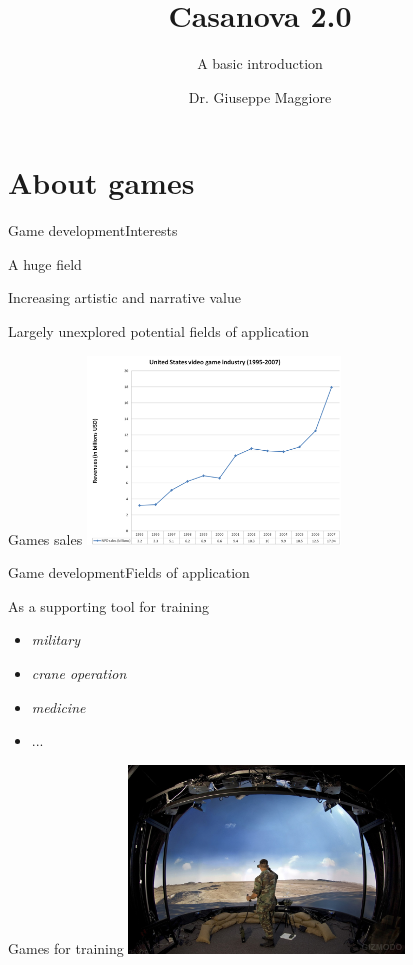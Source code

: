 \documentclass{beamer}
\title{Casanova 2.0}
\subtitle{A basic introduction}
\author{Dr. Giuseppe Maggiore}
\institute{NHTV University of Applied Sciences \\ 
Breda, Netherlands}
\date{}
\begin{document}
\maketitle

\section{About games}
\begin{slide}{Game development}{Interests}{
\item A huge field
\item Increasing artistic and narrative value \cite{GAMES_ART_NARRATIVE}
\item Largely unexplored potential fields of application
}\end{slide}

\begin{frame}{Games sales}
\center
\includegraphics[height=5cm]{Pics/games_sales.png}
\end{frame}

\begin{slide}{Game development}{Fields of application}{
\item As a supporting tool for training \cite{GAMES_FOR_TRAINING}
\begin{itemize}
\item \textit{military}
\item \textit{crane operation}
\item \textit{medicine}
\item ...
\end{itemize}
}\end{slide}

\begin{frame}{Games for training}
\center
\includegraphics[height=5cm]{Pics/military_simulator.png}
\end{frame}
\end{document}
